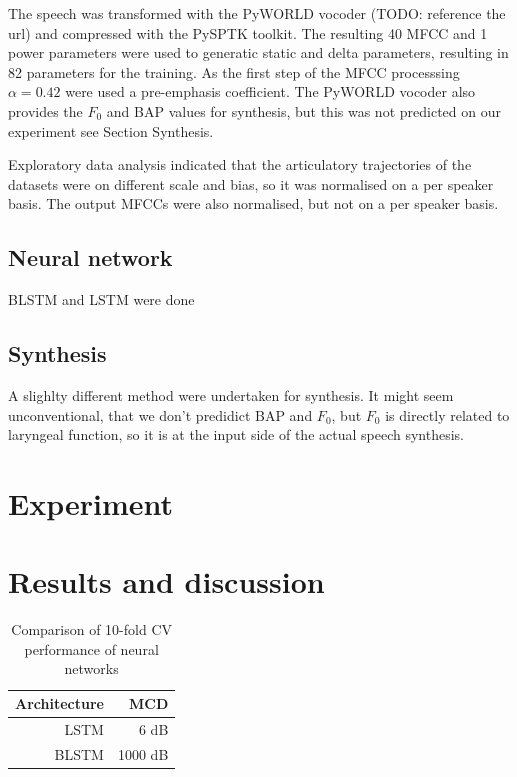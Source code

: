 \documentclass[a4paper]{article}
\begin{document}
The speech was transformed with the PyWORLD vocoder (TODO: reference the url) and
compressed with the PySPTK toolkit. The resulting 40 MFCC and 1 power parameters
were used to generatic static and delta parameters, resulting in 82 parameters
for the training. As the first step of the MFCC processsing \( \alpha
= 0.42 \) were used a pre-emphasis coefficient. The PyWORLD vocoder
also provides the $ F_0 $ and BAP values for synthesis, but this was
not predicted on our experiment see Section Synthesis.

Exploratory data analysis indicated that the articulatory trajectories of
the datasets were on different scale and bias, so it was normalised
on a per speaker basis.
The output MFCCs were also normalised, but not on a per speaker basis.

\subsection{Neural network}

BLSTM and LSTM were done

\subsection{Synthesis}

A slighlty different method were undertaken for synthesis. It might
seem unconventional, that we don't predidict BAP and $ F_0 $, but $ F_0 $
is directly related to laryngeal function, so it is at the input side
of the actual speech synthesis.
\section{Experiment}

\section{Results and discussion}
\begin{table}[th]
  \caption{Comparison of 10-fold CV performance of neural networks}
  \label{tab:example}
  \centering
  \begin{tabular}{ r r }
    \toprule
    \textbf{Architecture} & \textbf{MCD} \\
    \midrule
    LSTM & 6 dB \\
    BLSTM & 1000 dB               \\
    \bottomrule
  \end{tabular}
  
\end{table}
\end{document}
